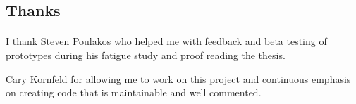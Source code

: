 \subsection{Thanks}
\paragraph{}
I thank Steven Poulakos who helped me with feedback and beta testing of prototypes during his fatigue study and proof reading the thesis.

Cary Kornfeld for allowing me to work on this project and continuous emphasis on creating code that is maintainable and well commented.


